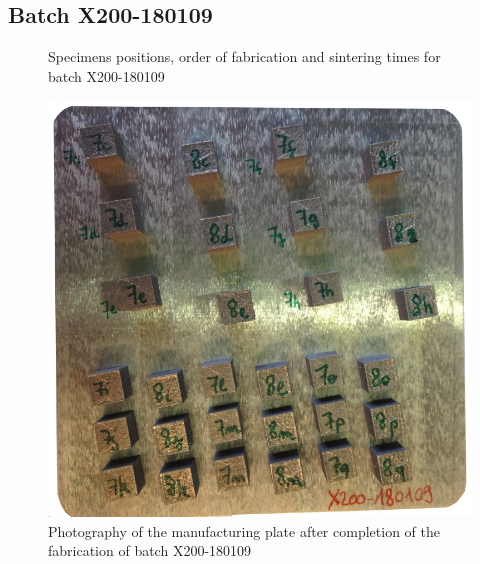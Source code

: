 \newpage
\subsection{Batch X200-180109}

\begin{figure}[ht]
\centering
\noindent{}
\decoRule
\caption[Specimens positions, order of fabrication and sintering times for batch X200-180109]{Specimens positions, order of fabrication and sintering times for batch X200-180109}
\label{fig:171024-cad}
\end{figure}

\begin{figure}[h!]
\centering
\includegraphics[scale=0.45]{Images/180109-real}
\decoRule
\caption[Photography of the manufacturing plate after completion of the fabrication of batch X200-180109]{Photography of the manufacturing plate after completion of the fabrication of batch X200-180109}
\label{fig:180109-real}
\end{figure}

